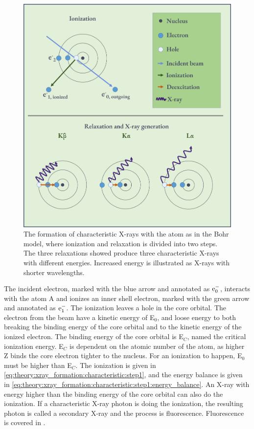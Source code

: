 \begin{figure}[ht]
    \centering
    \includegraphics[width=0.7\linewidth]{figures/characteristic_xray_formation.png}
    \caption{
        The formation of characteristic X-rays with the atom as in the Bohr model, where ionization and relaxation is divided into two steps.
        The three relaxations showed produce three characteristic X-rays with different energies.
        Increased energy is illustrated as X-rays with shorter wavelengths.
    }
    \label{fig:characteristic_xray_formation}
\end{figure}


The incident electron, marked with the blue arrow and annotated as $\textnormal{e}^-_{0}$, interacts with the atom A and ionizes an inner shell electron, marked with the green arrow and annotated as $\textnormal{e}^-_{1}$.
The ionization leaves a hole in the core orbital.
The electron from the beam have a kinetic energy of E$_{0}$, and loose energy to both breaking the binding energy of the core orbital and to the kinetic energy of the ionized electron.
The binding energy of the core orbital is E$_C$, named the critical ionization energy.
E$_C$ is dependent on the atomic number of the atom, as higher Z binds the core electron tighter to the nucleus.
For an ionization to happen, E$_0$ must be higher than E$_C$.
The ionization is given in \cref{eq:theory:xray_formation:characteristic:step1}, and the energy balance is given in \cref{eq:theory:xray_formation:characteristic:step1:energy_balance}.
An X-ray with energy higher than the binding energy of the core orbital can also do the ionization.
If a characteristic X-ray photon is doing the ionization, the resulting photon is called a secondary X-ray and the process is fluorescence.
Fluorescence is covered in .

